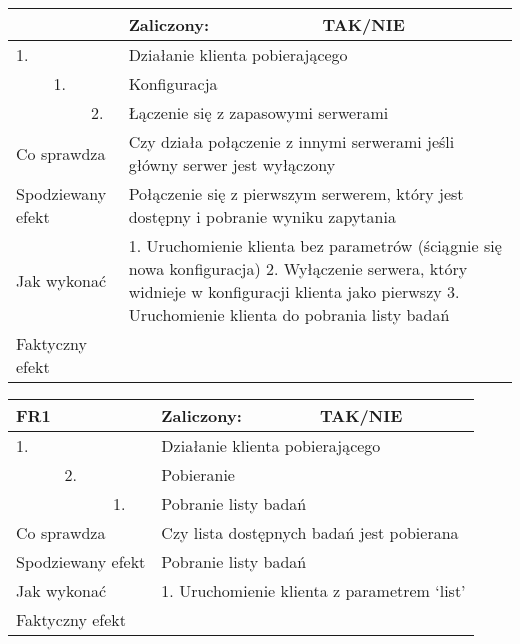 \begin{tabular}{|p{20pt}|p{20pt}|p{20pt}|p{250pt}|p{60pt}|}
	\hline
	\multicolumn{3}{|p{70pt}|}{} & Zaliczony: & TAK/NIE \\ \hline
	1. & & & \multicolumn{2}{|p{310pt}|}{Działanie klienta pobierającego } \\ \hline
	& 1. & & \multicolumn{2}{|p{310pt}|}{Konfiguracja } \\ \hline
	& & 2. & \multicolumn{2}{|p{310pt}|}{Łączenie się z zapasowymi serwerami } \\ \hline
	\multicolumn{3}{|p{70pt}|}{Co sprawdza} & \multicolumn{2}{|p{310pt}|}{Czy działa połączenie z innymi serwerami jeśli główny serwer jest wyłączony} \\ \hline
	\multicolumn{3}{|p{70pt}|}{Spodziewany efekt} & \multicolumn{2}{|p{310pt}|}{Połączenie się z pierwszym serwerem, który jest dostępny i pobranie wyniku zapytania} \\ \hline
	\multicolumn{3}{|p{70pt}|}{Jak wykonać} & \multicolumn{2}{|p{310pt}|}{1. Uruchomienie klienta bez parametrów (ściągnie się nowa konfiguracja)
2. Wyłączenie serwera, który widnieje w konfiguracji klienta jako pierwszy
3. Uruchomienie klienta do pobrania listy badań} \\ \hline
	\multicolumn{3}{|p{70pt}|}{Faktyczny efekt} & \multicolumn{2}{|p{310pt}|}{} \\ \hline
\end{tabular}

\begin{tabular}{|p{20pt}|p{20pt}|p{20pt}|p{250pt}|p{60pt}|}
	\hline
	\multicolumn{3}{|p{70pt}|}{FR1} & Zaliczony: & TAK/NIE \\ \hline
	1. & & & \multicolumn{2}{|p{310pt}|}{Działanie klienta pobierającego } \\ \hline
	& 2. & & \multicolumn{2}{|p{310pt}|}{Pobieranie } \\ \hline
	& & 1. & \multicolumn{2}{|p{310pt}|}{Pobranie listy badań } \\ \hline
	\multicolumn{3}{|p{70pt}|}{Co sprawdza} & \multicolumn{2}{|p{310pt}|}{Czy lista dostępnych badań jest pobierana} \\ \hline
	\multicolumn{3}{|p{70pt}|}{Spodziewany efekt} & \multicolumn{2}{|p{310pt}|}{Pobranie listy badań} \\ \hline
	\multicolumn{3}{|p{70pt}|}{Jak wykonać} & \multicolumn{2}{|p{310pt}|}{1. Uruchomienie klienta z parametrem ‘list’} \\ \hline
	\multicolumn{3}{|p{70pt}|}{Faktyczny efekt} & \multicolumn{2}{|p{310pt}|}{} \\ \hline
\end{tabular}

